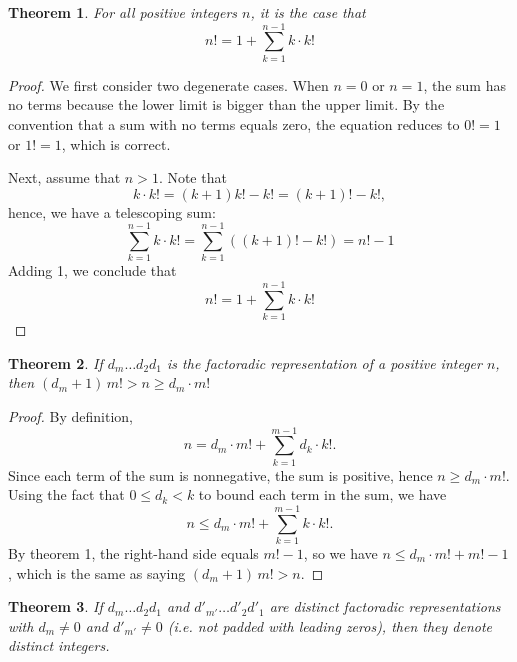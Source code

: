 \documentclass[12pt]{article}
\newtheorem{theorem}{Theorem}
\begin{document}
\begin{theorem}
For all positive integers $n$, it is the case that 
 \[n! = 1 + \sum_{k = 1}^{n - 1} k \cdot k!\]
\end{theorem}

\begin{proof}
We first consider two degenerate cases.  When $n=0$
or $n=1$, the sum has no terms because the lower limit
is bigger than the upper limit.  By the convention that
a sum with no terms equals zero, the equation reduces 
to $0! = 1$ or $1! = 1$, which is correct.

Next, assume that $n > 1$.  Note that 
 \[k \cdot k! = (k + 1) k! - k! = (k + 1)! - k!,\]
hence, we have a telescoping sum:
 \[\sum_{k = 1}^{n - 1} k \cdot k! = \sum_{k = 1}^{n - 1}
\left( (k + 1)! - k! \right) = n! - 1\]
Adding 1, we conclude that
 \[n! = 1 + \sum_{k = 1}^{n - 1} k \cdot k!\]
\end {proof}

\begin{theorem}
If $d_m \ldots d_2 d_1$ is the factoradic representation of
a positive integer $n$, then $(d_m + 1) \, m! > n \ge d_m 
\cdot m!$
\end{theorem}

\begin{proof}
By definition,
\[ n = d_m \cdot m! + \sum_{k=1}^{m-1} d_k \cdot k! .\]
Since each term of the sum is nonnegative, the sum is positive,
hence $n \ge d_m \cdot m!$.  Using the fact that $0 \le d_k < k$ 
to bound each term in the sum, we have
\[ n \le d_m \cdot m! + \sum_{k=1}^{m-1} k \cdot k!.\]
By theorem 1, the right-hand side equals $m! - 1$, so we have
$n \le d_m \cdot m! + m! - 1$, which is the same as saying 
$(d_m + 1) \, m! > n$.
\end{proof}

\begin{theorem}
If $d_m \ldots d_2 d_1$ and ${d'}_{m'} \ldots {d'}_2 {d'}_1$ are
distinct factoradic representations with $d_m \neq 0$ and ${d'}_{m'}
\neq 0$  (i.e. not padded with leading zeros), then they denote 
distinct integers.
\end{theorem}
\end{document}
